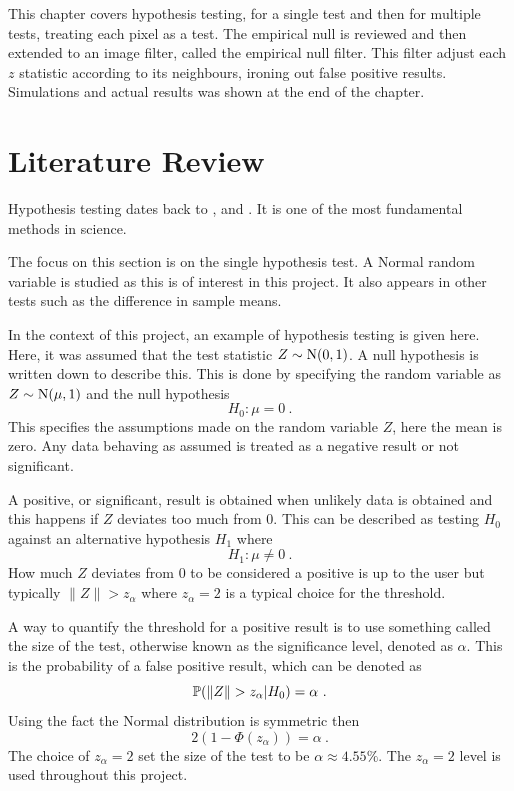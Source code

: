 This chapter covers hypothesis testing, for a single test and then for multiple tests, treating each pixel as a test. The empirical null is reviewed and then extended to an image filter, called the empirical null filter. This filter adjust each $z$ statistic according to its neighbours, ironing out false positive results. Simulations and actual results was shown at the end of the chapter.

\section{Literature Review}

Hypothesis testing dates back to \cite{pearson1900on}, \cite{neyman1933on} and \cite{fisher1970statistical}. It is one of the most fundamental methods in science.

The focus on this section is on the single hypothesis test. A Normal random variable is studied as this is of interest in this project. It also appears in other tests such as the difference in sample means.

In the context of this project, an example of hypothesis testing is given here. Here, it was assumed that the test statistic $Z\sim\operatorname{N}(0,1)$. A null hypothesis is written down to describe this. This is done by specifying the random variable as $Z\sim\operatorname{N}(\mu,1)$ and the null hypothesis
\begin{equation}
    H_0:\mu=0 \ .
\end{equation}
This specifies the assumptions made on the random variable $Z$, here the mean is zero. Any data behaving as assumed is treated as a negative result or not significant.

A positive, or significant, result is obtained when unlikely data is obtained and this happens if $Z$ deviates too much from 0. This can be described as testing $H_0$ against an alternative hypothesis $H_1$ where
\begin{equation}
    H_1:\mu\neq0 \ .
\end{equation}
How much $Z$ deviates from 0 to be considered a positive is up to the user but typically $\|Z\|>z_\alpha$ where $z_\alpha =2$ is a typical choice for the threshold.

A way to quantify the threshold for a positive result is to use something called the size of the test, otherwise known as the significance level, denoted as $\alpha$. This is the probability of a false positive result, which can be denoted as
\begin{equation}
    \prob(\|Z\|>z_\alpha|H_0) = \alpha \ .
\end{equation}
Using the fact the Normal distribution is symmetric then
\begin{equation}
    2(1 - \Phi(z_\alpha)) = \alpha \ .
    \label{eq:inference_single_alpha}
\end{equation}
The choice of $z_\alpha=2$ set the size of the test to be $\alpha\approx 4.55\%$. The $z_\alpha=2$ level is used throughout this project.

